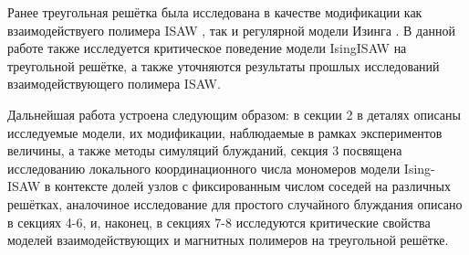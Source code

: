 Ранее треугольная решётка была исследована в качестве модификации как взаимодействуего полимера ISAW \cite{Privman1986}, 
так и регулярной модели Изинга \cite{ShchurTriangle, selke2006critical}. 
В данной работе также исследуется критическое поведение модели IsingISAW на треугольной решётке, а также уточняются результаты прошлых исследований взаимодействующего полимера ISAW.

Дальнейшая работа устроена следующим образом:
в секции 2 в деталях описаны исследуемые модели, их модификации, наблюдаемые в рамках экспериментов величины, а также методы симуляций блужданий,
секция 3 посвящена исследованию локального координационного числа мономеров модели Ising-ISAW в контексте долей узлов с фиксированным числом соседей на различных решётках,
аналочиное исследование для простого случайного блуждания описано в секциях 4-6,
и, наконец, в секциях 7-8 исследуются критические свойства моделей взаимодействующих и магнитных полимеров на треугольной решётке.
